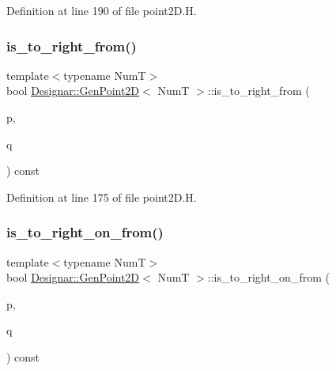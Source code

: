 Definition at line 190 of file point2\+D.\+H.

\mbox{\label{class_designar_1_1_gen_point2_d_acb12e43d036b0a5719af3887814a2684}} 
\subsubsection{\texorpdfstring{is\+\_\+to\+\_\+right\+\_\+from()}{is\_to\_right\_from()}}
{\footnotesize\ttfamily template$<$typename NumT$>$ \\
bool \hyperlink{class_designar_1_1_gen_point2_d}{Designar\+::\+Gen\+Point2D}$<$ NumT $>$\+::is\+\_\+to\+\_\+right\+\_\+from (\begin{DoxyParamCaption}\item[{const \hyperlink{class_designar_1_1_gen_point2_d}{Gen\+Point2D}$<$ NumT $>$ \&}]{p,  }\item[{const \hyperlink{class_designar_1_1_gen_point2_d}{Gen\+Point2D}$<$ NumT $>$ \&}]{q }\end{DoxyParamCaption}) const\hspace{0.3cm}{\ttfamily [inline]}}



Definition at line 175 of file point2\+D.\+H.

\mbox{\label{class_designar_1_1_gen_point2_d_ac8980c31c7c8075510e3e74f4358b305}} 
\subsubsection{\texorpdfstring{is\+\_\+to\+\_\+right\+\_\+on\+\_\+from()}{is\_to\_right\_on\_from()}}
{\footnotesize\ttfamily template$<$typename NumT$>$ \\
bool \hyperlink{class_designar_1_1_gen_point2_d}{Designar\+::\+Gen\+Point2D}$<$ NumT $>$\+::is\+\_\+to\+\_\+right\+\_\+on\+\_\+from (\begin{DoxyParamCaption}\item[{const \hyperlink{class_designar_1_1_gen_point2_d}{Gen\+Point2D}$<$ NumT $>$ \&}]{p,  }\item[{const \hyperlink{class_designar_1_1_gen_point2_d}{Gen\+Point2D}$<$ NumT $>$ \&}]{q }\end{DoxyParamCaption}) const\hspace{0.3cm}{\ttfamily [inline]}}



